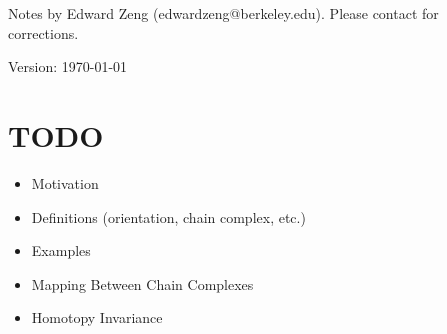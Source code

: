 \def\topic{Simplicial Homology}



    \begin{center}
        \color{blue}
        \textsf{Notes by Edward Zeng (edwardzeng@berkeley.edu). Please contact for corrections.}

        \color{red}
        \textsf{Version: \today}
    \end{center}

    
    

    \newpage
    \section{TODO}
    \begin{itemize}
        \item Motivation
        \item Definitions (orientation, chain complex, etc.)
        \item Examples
        \item Mapping Between Chain Complexes
        \item Homotopy Invariance
    \end{itemize}


